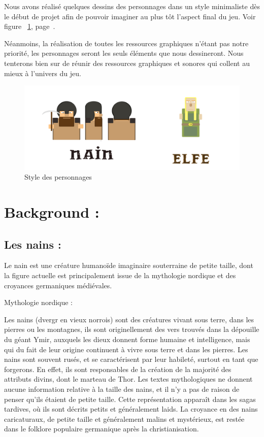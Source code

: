 \documentclass[a4paper]{report}
\begin{document}
Nous avons réalisé quelques dessins des personnages dans un style minimaliste dès le début de projet afin de pouvoir imaginer au plus tôt l'aspect final du jeu. Voir figure ~\ref{Personnages}, page~\pageref{Personnages}.

Néanmoins, la réalisation de toutes les ressources graphiques n'étant pas notre priorité, les personnages seront les seuls éléments que nous dessineront. Nous tenterons bien sur de réunir des ressources graphiques et sonores qui collent au mieux à l'univers du jeu.

\begin{figure}
    \center
    \includegraphics[width=15cm]{img/divers/chara}
    \caption{Style des personnages}
		\label{Personnages}
\end{figure}

\newpage

\chapter*{Background :}

\section*{Les nains :}

Le nain est une créature humanoïde imaginaire souterraine de petite taille, dont la figure actuelle est principalement issue de la mythologie nordique et des croyances germaniques médiévales.


Mythologie nordique : 

Les nains (dvergr en vieux norrois) sont des créatures vivant sous terre, dans les pierres ou les montagnes, ils sont originellement des vers trouvés dans la dépouille du géant Ymir, auxquels les dieux donnent forme humaine et 
intelligence, mais qui du fait de leur origine continuent à vivre sous terre et dans les pierres. Les nains sont souvent rusés, et se caractérisent par leur habileté, surtout en tant que forgerons. En effet, ils sont responsables
de la création de la majorité des attributs divins, dont le marteau de Thor. Les textes mythologiques ne donnent aucune information relative à la taille des nains, et il n'y a pas de raison de penser qu'ils étaient de petite taille.
Cette représentation apparaît dans les sagas tardives, où ils sont décrits petits et généralement laids. La croyance en des nains caricaturaux, de petite taille et généralement malins et mystérieux, est restée dans le folklore 
populaire germanique après la christianisation.
\end{document}
